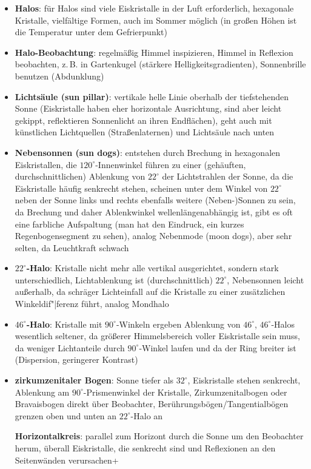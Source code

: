 \begin{itemize}
    \item
    \textbf{Halos}:
    für Halos sind viele Eiskristalle in der Luft erforderlich,
    hexagonale Kristalle, vielfältige Formen, auch im Sommer möglich
    (in großen Höhen ist die Temperatur unter dem Gefrierpunkt)

    \item
    \textbf{Halo-Beobachtung}:
    regelmäßig Himmel inspizieren, Himmel in Reflexion beobachten, z.\,B. in
    Gartenkugel (stärkere Helligkeitsgradienten), Sonnenbrille benutzen
    (Abdunklung)

    \item
    \textbf{Lichtsäule (sun pillar)}:
    vertikale helle Linie oberhalb der tiefstehenden Sonne
    (Eiskristalle haben eher horizontale Ausrichtung, sind aber leicht
    gekippt, reflektieren Sonnenlicht an ihren Endflächen),
    geht auch mit künstlichen Lichtquellen (Straßenlaternen) und
    Lichtsäule nach unten

    \item
    \textbf{Nebensonnen (sun dogs)}:
    entstehen durch Brechung in hexagonalen Eiskristallen,
    die $120^\circ$-Innenwinkel führen zu einer (gehäuften, durchschnittlichen)
    Ablenkung von $22^\circ$ der Lichtstrahlen der Sonne, da die
    Eiskristalle häufig senkrecht stehen, scheinen unter dem Winkel von
    $22^\circ$ neben der Sonne links und rechts ebenfalls weitere
    (Neben-)Sonnen zu sein,
    da Brechung und daher Ablenkwinkel wellenlängenabhängig ist,
    gibt es oft eine farbliche Aufspaltung
    (man hat den Eindruck, ein kurzes Regenbogensegment zu sehen),
    analog Nebenmode (moon dogs), aber sehr selten, da Leuchtkraft schwach

    \item
    \textbf{$22^\circ$-Halo}:
    Kristalle nicht mehr alle vertikal ausgerichtet,
    sondern stark unterschiedlich, Lichtablenkung ist (durchschnittlich)
    $22^\circ$,
    Nebensonnen leicht außerhalb, da schräger Lichteinfall auf die Kristalle
    zu einer zusätzlichen Winkeldif"|ferenz führt,
    analog Mondhalo

    \item
    \textbf{$46^\circ$-Halo}:
    Kristalle mit $90^\circ$-Winkeln ergeben Ablenkung von $46^\circ$,
    $46^\circ$-Halos wesentlich seltener, da
    größerer Himmelsbereich voller Eiskristalle sein muss,
    da weniger Lichtanteile durch $90^\circ$-Winkel laufen
    und da der Ring breiter ist (Dispersion, geringerer Kontrast)

    \item
    \textbf{zirkumzenitaler Bogen}:
    Sonne tiefer als $32^\circ$, Eiskristalle stehen senkrecht,
    Ablenkung am $90^\circ$-Prismenwinkel der Kristalle,
    Zirkumzenitalbogen oder Bravaisbogen direkt über Beobachter,
    Berührungsbögen/Tangentialbögen grenzen oben und unten an $22^\circ$-Halo
    an

    \textbf{Horizontalkreis}:
    parallel zum Horizont durch die Sonne um den Beobachter herum,
    überall Eiskristalle, die senkrecht sind und Reflexionen an den
    Seitenwänden verursachen+
\end{itemize}

\pagebreak

